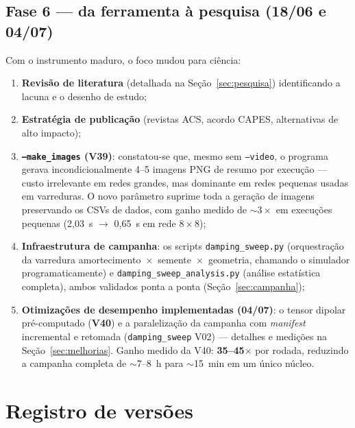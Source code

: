 \documentclass[11pt,a4paper]{article}
\newcommand{\code}[1]{\texttt{#1}}
\begin{document}
\subsection{Fase 6 --- da ferramenta à pesquisa (18/06 e 04/07)}

Com o instrumento maduro, o foco mudou para ciência:

\begin{enumerate}
\item \textbf{Revisão de literatura} (detalhada na
Seção~\ref{sec:pesquisa}) identificando a lacuna e o desenho de estudo;
\item \textbf{Estratégia de publicação} (revistas ACS, acordo CAPES,
alternativas de alto impacto);
\item \textbf{\code{--make\_images} (V39)}: constatou-se que, mesmo sem
\code{--video}, o programa gerava incondicionalmente 4--5 imagens PNG de
resumo por execução --- custo irrelevante em redes grandes, mas
dominante em redes pequenas usadas em varreduras. O novo parâmetro
suprime toda a geração de imagens preservando os CSVs de dados, com
ganho medido de $\sim 3\times$ em execuções pequenas (2{,}03~s $\to$
0{,}65~s em rede $8\times8$);
\item \textbf{Infraestrutura de campanha}: os scripts
\code{damping\_sweep.py} (orquestração da varredura
amortecimento~$\times$~semente~$\times$~geometria, chamando o simulador
programaticamente) e \code{damping\_sweep\_analysis.py} (análise
estatística completa), ambos validados ponta a ponta
(Seção~\ref{sec:campanha});
\item \textbf{Otimizações de desempenho implementadas (04/07)}: o tensor
dipolar pré-computado (\textbf{V40}) e a paralelização da campanha com
\emph{manifest} incremental e retomada (\code{damping\_sweep} V02) ---
detalhes e medições na Seção~\ref{sec:melhorias}. Ganho medido da V40:
\textbf{35--45$\times$} por rodada, reduzindo a campanha completa de
$\sim$7--8~h para $\sim$15~min em um único núcleo.
\end{enumerate}

\section{Registro de versões}
\end{document}
